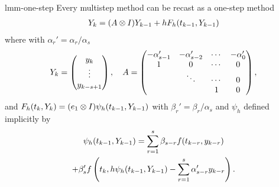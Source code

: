 \begin{Lemma}{lmm-one-step}
  Every multistep method can be recast as a one-step method
  \begin{gather}
    \label{eq:lmm-one-step:1}
    Y_{k} = (A\otimes I) Y_{k-1} + h F_h(t_{k-1}, Y_{k-1})
  \end{gather}
  where with $\alpha_r' = \alpha_r/\alpha_s$
  \begin{gather}
    \label{eq:lmm-one-step:2}
    Y_k =
    \begin{pmatrix}
      y_k \\ \vdots \\ y_{k-s+1}
    \end{pmatrix},
    \quad
    A =
    \begin{pmatrix}
      -\alpha_{s-1}' & -\alpha_{s-2}' & \cdots & -\alpha_{0}'\\
      1 & 0 & \cdots & 0 \\
      & \ddots & \cdots & 0 \\
      & & 1 & 0
    \end{pmatrix},
  \end{gather}
  and $F_h(t_k, Y_k) = (e_1\otimes I) \psi_h(t_{k-1}, Y_{k-1})$ with
  $\beta_r' = \beta_r/\alpha_s$ and $\psi_h$ defined implicitly by
  \begin{multline}
    \label{eq:lmm-one-step:3}
    \psi_h(t_{k-1}, Y_{k-1})
    =\sum_{r=1}^{s} \beta_{s-r} f(t_{k-r},y_{k-r})
    \\
    + \beta_s' f\left(t_k, h\psi_h(t_{k-1}, Y_{k-1}) -
      \sum_{r=1}^{s} \alpha_{s-r}' y_{k-r}\right).
  \end{multline}
\end{Lemma}

